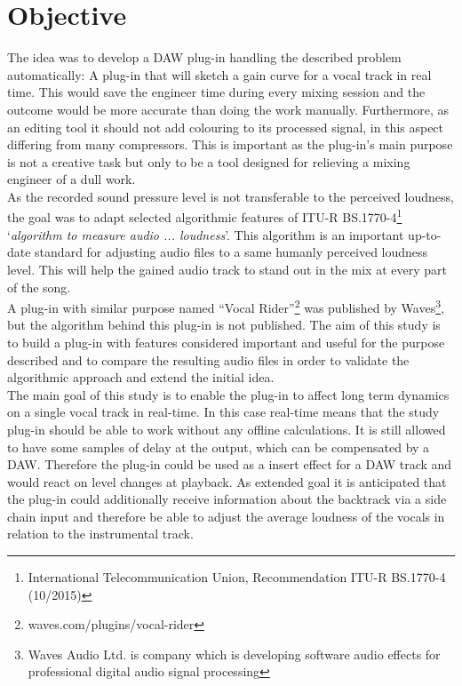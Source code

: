 \section{Objective}

The idea was to develop a DAW plug-in handling the described problem automatically: A plug-in that will sketch a gain curve for a vocal track in real time. This would save the engineer time during every mixing session and the outcome would be more accurate than doing the work manually. Furthermore, as an editing tool it should not add colouring to its processed signal, in this aspect differing from many compressors. This is important as the plug-in's main purpose is not a creative task but only to be a tool designed for relieving a mixing engineer of a dull work.\\
As the recorded sound pressure level is not transferable to the perceived loudness, the goal was to adapt selected algorithmic features of ITU-R BS.1770-4\footnote{International Telecommunication Union, Recommendation ITU-R BS.1770-4 (10/2015)} ‘\textit{algorithm to measure audio ... loudness}’. This algorithm is an important up-to-date standard for adjusting audio files to a same humanly perceived loudness level. This will help the gained audio track to stand out in the mix at every part of the song.\\
A plug-in with similar purpose named “Vocal Rider”\footnote{waves.com/plugins/vocal-rider} was published by Waves\footnote{Waves Audio Ltd. is company which is developing software audio effects for professional digital audio signal processing}, but the algorithm behind this plug-in is not published. The aim of this study is to build a plug-in with features considered important and useful for the purpose described and to compare the resulting audio files in order to validate the algorithmic approach and extend the initial idea.\\
The main goal of this study is to enable the plug-in to affect long term dynamics on a single vocal track in real-time. In this case real-time means that the study plug-in should be able to work without any offline calculations. It is still allowed to have some samples of delay at the output, which can be compensated by a DAW. Therefore the plug-in could be used as a insert effect for a DAW track and would react on level changes at playback. As extended goal it is anticipated that the plug-in could additionally receive information about the backtrack via a side chain input and therefore be able to adjust the average loudness of the vocals in relation to the instrumental track.\\

